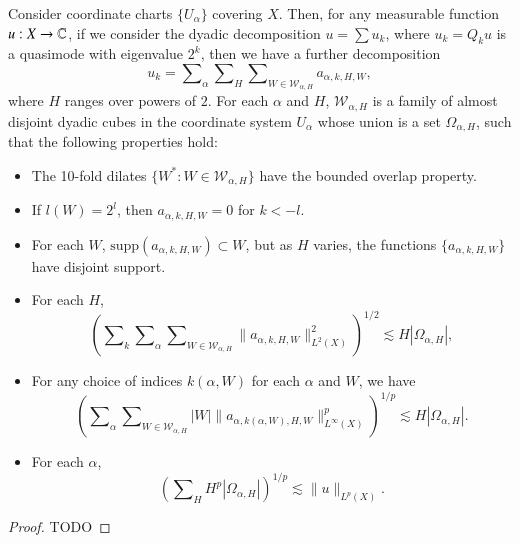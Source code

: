 \begin{lemma} \label{atomicdecompositionlemma}
    Consider coordinate charts $\{ U_\alpha \}$ covering $X$. Then, for any measurable function $u: X \to \operatorname{\mathbb{C}}$, if we consider the dyadic decomposition $u = \sum u_k$, where $u_k = Q_k u$ is a quasimode with eigenvalue $2^k$, then we have a further decomposition
    \[ u_k = \sum\nolimits_\alpha \sum\nolimits_H \sum\nolimits_{W \in \mathcal{W}_{\alpha,H}} a_{\alpha,k,H,W}, \]
    where $H$ ranges over powers of $2$. For each $\alpha$ and $H$, $\mathcal{W}_{\alpha,H}$ is a family of almost disjoint dyadic cubes in the coordinate system $U_\alpha$ whose union is a set $\Omega_{\alpha,H}$, such that the following properties hold:
    \begin{itemize}
        \item The 10-fold dilates $\{ W^* : W \in \mathcal{W}_{\alpha,H} \}$ have the bounded overlap property.

        \item If $l(W) = 2^l$, then $a_{\alpha,k,H,W} = 0$ for $k < -l$.

        \item For each $W$, $\text{supp}(a_{\alpha,k,H,W}) \subset W$, but as $H$ varies, the functions $\{ a_{\alpha,k,H,W} \}$ have disjoint support.

        \item For each $H$,
        \[ \left( \sum\nolimits_k \sum\nolimits_\alpha \sum\nolimits_{W \in \mathcal{W}_{\alpha,H}} \| a_{\alpha,k,H,W} \|_{L^2(X)}^2 \right)^{1/2} \lesssim H |\Omega_{\alpha,H}|, \]

        \item For any choice of indices $k(\alpha,W)$ for each $\alpha$ and $W$, we have
        \[ \left( \sum\nolimits_\alpha \sum\nolimits_{W \in \mathcal{W}_{\alpha,H}} |W| \| a_{\alpha,k(\alpha,W),H,W} \|_{L^\infty(X)}^p \right)^{1/p} \lesssim H |\Omega_{\alpha,H}|. \]

        \item For each $\alpha$,
        \[ \left( \sum\nolimits_H H^p |\Omega_{\alpha,H}| \right)^{1/p} \lesssim \| u \|_{L^p(X)}. \]
    \end{itemize}
\end{lemma}
\begin{proof}
    TODO
\end{proof}


